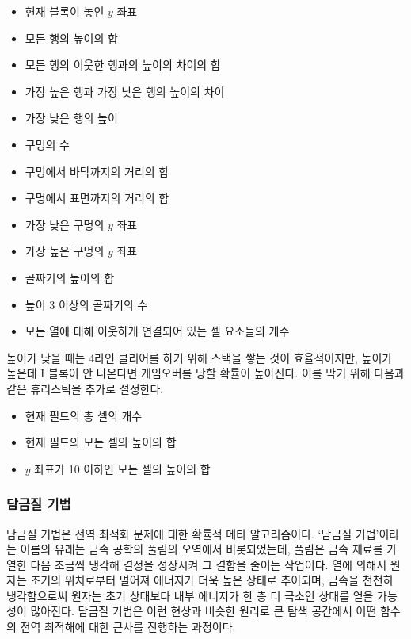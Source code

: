 \begin{multicols}{2}
    \begin{itemize}
        \item 현재 블록이 놓인 $y$ 좌표
        \item 모든 행의 높이의 합
        \item 모든 행의 이웃한 행과의 높이의 차이의 합
        \item 가장 높은 행과 가장 낮은 행의 높이의 차이
        \item 가장 낮은 행의 높이
        \item 구멍의 수
        \item 구멍에서 바닥까지의 거리의 합
        \item 구멍에서 표면까지의 거리의 합
        \item 가장 낮은 구멍의 $y$ 좌표
        \item 가장 높은 구멍의 $y$ 좌표
        \item 골짜기의 높이의 합
        \item 높이 3 이상의 골짜기의 수
        \item 모든 열에 대해 이웃하게 연결되어 있는 셀 요소들의 개수
    \end{itemize}
\end{multicols}

높이가 낮을 때는 4라인 클리어를 하기 위해 스택을 쌓는 것이 효율적이지만, 높이가 높은데 I 블록이 안 나온다면 게임오버를 당할 확률이 높아진다.
이를 막기 위해 다음과 같은 휴리스틱을 추가로 설정한다.

\begin{itemize}
    \item 현재 필드의 총 셀의 개수
    \item 현재 필드의 모든 셀의 높이의 합
    \item $y$ 좌표가 10 이하인 모든 셀의 높이의 합
\end{itemize}

\subsubsection{담금질 기법} 담금질 기법은 전역 최적화 문제에 대한 확률적 메타 알고리즘이다. `담금질 기법'이라는 이름의 유래는
금속 공학의 풀림의 오역에서 비롯되었는데, 풀림은 금속 재료를 가열한 다음 조금씩 냉각해 결정을 성장시켜 그 결함을 줄이는 작업이다.
열에 의해서 원자는 초기의 위치로부터 멀어져 에너지가 더욱 높은 상태로 추이되며, 금속을 천천히 냉각함으로써 원자는 초기 상태보다 내부 에너지가 한 층 더 극소인 상태를
얻을 가능성이 많아진다. 담금질 기법은 이런 현상과 비슷한 원리로 큰 탐색 공간에서 어떤 함수의 전역 최적해에 대한 근사를 진행하는 과정이다.\cite{1981Khachaturyan}

